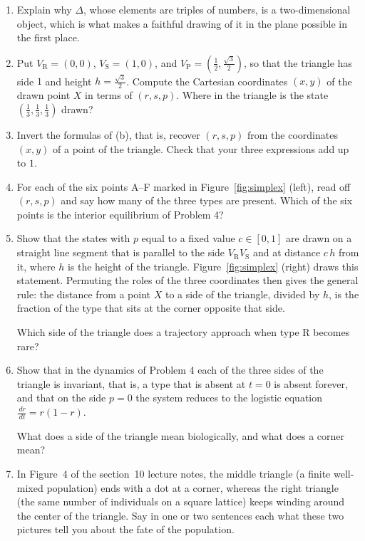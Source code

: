 \documentclass[a4paper,12pt]{article}
\newcommand{\dd}{\,d}
\begin{document}
\begin{enumerate}[label=(\alph*)]
\item Explain why $\Delta$, whose elements are triples of numbers, is a two-dimensional object, which is what makes a faithful drawing of it in the plane possible in the first place.

\item Put $V_{\text{R}}=\left( 0,0 \right)$, $V_{\text{S}}=\left( 1,0 \right)$, and $V_{\text{P}}=\left( \frac{1}{2},\frac{\sqrt{3}}{2} \right)$, so that the triangle has side $1$ and height $h=\frac{\sqrt{3}}{2}$. Compute the Cartesian coordinates $\left( x,y \right)$ of the drawn point $X$ in terms of $\left( r,s,p \right)$. Where in the triangle is the state $\left( \frac13,\frac13,\frac13 \right)$ drawn?

\item Invert the formulas of (b), that is, recover $\left( r,s,p \right)$ from the coordinates $\left( x,y \right)$ of a point of the triangle. Check that your three expressions add up to $1$.

\item For each of the six points A--F marked in Figure~\ref{fig:simplex} (left), read off $\left( r,s,p \right)$ and say how many of the three types are present. Which of the six points is the interior equilibrium of Problem 4?

\item Show that the states with $p$ equal to a fixed value $c \in \left[ 0,1 \right]$ are drawn on a straight line segment that is parallel to the side $V_{\text{R}}V_{\text{S}}$ and at distance $c\,h$ from it, where $h$ is the height of the triangle. Figure~\ref{fig:simplex} (right) draws this statement. Permuting the roles of the three coordinates then gives the general rule: the distance from a point $X$ to a side of the triangle, divided by $h$, is the fraction of the type that sits at the corner opposite that side.

Which side of the triangle does a trajectory approach when type R becomes rare?

\item Show that in the dynamics of Problem 4 each of the three sides of the triangle is invariant, that is, a type that is absent at $t=0$ is absent forever, and that on the side $p=0$ the system reduces to the logistic equation $\frac{\dd r}{\dd t} = r\left( 1-r \right)$.

What does a side of the triangle mean biologically, and what does a corner mean?

\item In Figure~4 of the section~10 lecture notes, the middle triangle (a finite well-mixed population) ends with a dot at a corner, whereas the right triangle (the same number of individuals on a square lattice) keeps winding around the center of the triangle. Say in one or two sentences each what these two pictures tell you about the fate of the population.
\end{enumerate}
\end{document}
